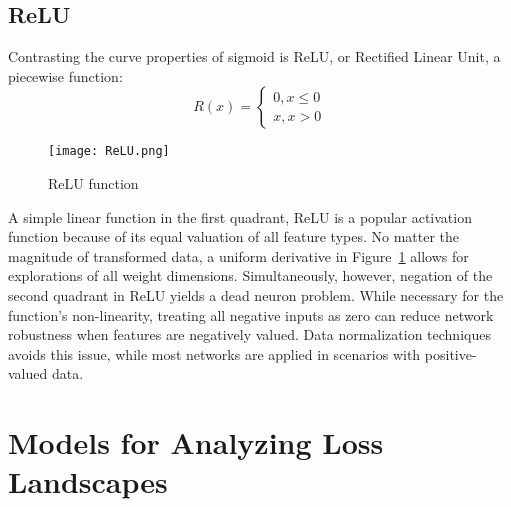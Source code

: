 \documentclass{article}
\theoremstyle{definition}
\begin{document}
\subsection{ReLU}
Contrasting the curve properties of sigmoid is ReLU, or Rectified Linear Unit, a piecewise function:
\begin{equation}
\label{relu}
R(x) = \begin{cases}
0,  x \leq 0 \\
x,  x > 0
\end{cases}
\end{equation}
\begin{figure}[H]
    \centering
    \texttt{[image: ReLU.png]}
    \caption{ReLU function}
    \label{fig:Figure 5}
\end{figure}
A simple linear function in the first quadrant, ReLU is a popular activation function because of its equal valuation of all feature types. No matter the magnitude of transformed data, a uniform derivative in Figure~\ref{fig:Figure 5} allows for explorations of all weight dimensions. Simultaneously, however, negation of the second quadrant in ReLU yields a dead neuron problem. While necessary for the function's non-linearity, treating all negative inputs as zero can reduce network robustness when features are negatively valued. Data normalization techniques avoids this issue, while most networks are applied in scenarios with positive-valued data. 
\section{Models for Analyzing Loss Landscapes}
\label{sec:loss_metrics}
\end{document}
